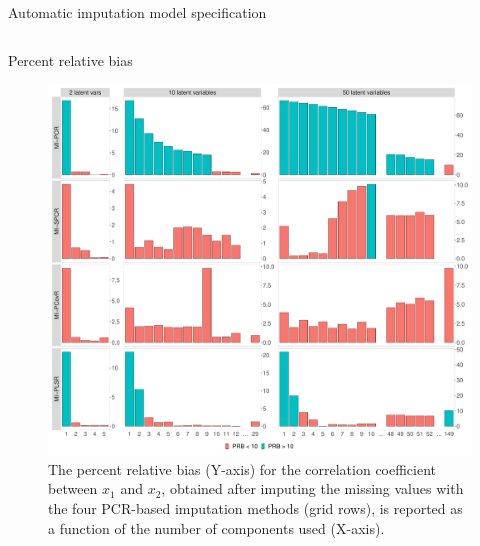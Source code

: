 \documentclass{beamer}\usepackage[]{graphicx}\usepackage[]{xcolor}
\makeatletter
\def\maxwidth{ %
  \ifdim\Gin@nat@width>\linewidth
    \linewidth
  \else
    \Gin@nat@width
  \fi
}
\newenvironment{knitrout}{}{} %
\makeatother
\begin{document}
\begin{frame}[fragile]
\begin{columns}[T]
\begin{column}{.42\textwidth}
\begin{block}{Automatic imputation model specification}
\end{block}

\end{column}

\end{columns}

\bigskip
{\hrulefill}
\bigskip


\begin{columns}


  \begin{column}{.46\textwidth}
    \begin{block}{Percent relative bias}

      \begin{figure}
        \centering
\begin{knitrout}
\color{fgcolor}

{\centering \includegraphics[width=\maxwidth]{figure/plot-prb-1} 

}


\end{knitrout}
          \caption{
            \label{fig:prb-text} 
            The percent relative bias (Y-axis) for the correlation coefficient between $x_1$ and $x_2$, obtained after imputing the missing values with the four PCR-based imputation methods (grid rows), is reported as a function of the number of components used (X-axis).
            }
        \end{figure}
        

\end{block}
\end{column}
\end{columns}
\end{frame}
\end{document}
